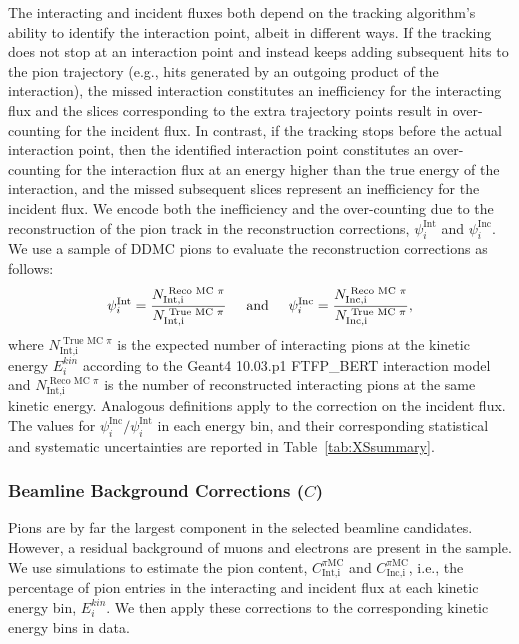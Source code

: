 \documentclass[%
 floatfix,
 reprint,
 twocolumn,
superscriptaddress,
showpacs,preprintnumbers,
 amsmath,amssymb,
 aps,
prd,
]{revtex4-1}
\begin{document}
The interacting and incident fluxes both depend on the tracking algorithm's ability to identify the interaction point, albeit in different ways. If the tracking does not stop at an interaction point and instead keeps adding subsequent hits to the pion trajectory (e.g., hits generated by an outgoing product of the interaction), the missed interaction constitutes an inefficiency for the interacting flux and the slices corresponding to the extra trajectory points result in over-counting for the incident flux. In contrast, if the tracking stops before the actual interaction point, then the identified interaction point constitutes an over-counting for the interaction flux at an energy higher than the true energy of the interaction, and the missed subsequent slices represent an inefficiency for the incident flux. We encode both the inefficiency and the over-counting due to the reconstruction of the pion track in the reconstruction corrections, $\psi^{\text{Int}}_i$ and $\psi^{\text{Inc}}_i$. We use a sample of DDMC pions to evaluate the reconstruction corrections as follows:
\begin{equation}
 \psi^{\text{Int}}_i  =  \frac{N^{\text{ Reco MC $\pi$}}_{\text{Int,i}}}{ N^{\text{ True MC  $\pi$}}_{\text{Int,i}}  } \hspace{0.5cm}\text{and}\hspace{0.5cm}  \psi^{\text{Inc}}_i  =  \frac{N^{\text{ Reco MC $\pi$}}_{\text{Inc,i}}}{ N^{\text{ True MC  $\pi$}}_{\text{Inc,i}}  },
\end{equation}
where $N^{\text{ True MC  $\pi$}}_{\text{Int,i}}$ is the expected number of interacting pions at the kinetic energy $E^{kin}_i$ according to the Geant4 10.03.p1 FTFP\_BERT interaction model and  $N^{\text{ Reco MC $\pi$}}_{\text{Int,i}}$ is the number of reconstructed interacting pions at the same kinetic energy. Analogous definitions apply to the correction on the incident flux. The values for $\psi^{\text{Inc}}_i/\psi^{\text{Int}}_i$ in each energy bin, and their corresponding statistical  and systematic uncertainties are reported in Table~\ref{tab:XSsummary}.



\subsubsection{Beamline Background Corrections ($C$)}
Pions are by far the largest component in the selected beamline candidates. However, a residual background of muons and electrons are present in the sample. We use simulations to estimate the pion content, $C^{\pi \text{MC}}_{\text{Int,i}}$ and  $C^{\pi \text{MC}}_{\text{Inc,i}}$, i.e., the percentage of pion entries in the interacting and incident flux at each kinetic energy bin, $E^{kin}_i$. We then apply these corrections to the corresponding kinetic energy bins in data.  
\end{document}
